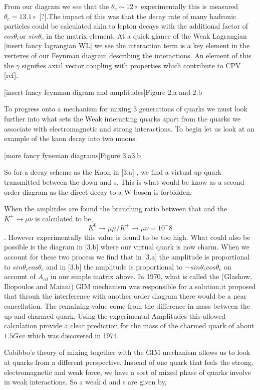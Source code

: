 From our diagram we see that the $\theta_c\sim 12\circ$ experimentally this is measured $\theta_c = 13.1\circ$ [?].The impact of this was that the decay rate of many hadronic particles could be calculated akin to lepton decays with the additional factor of $cos\theta_c$or $sin\theta_c$ in the matrix element. At a quick glance of the Weak Lagrangian [insert fancy lagrangian WL] we see the interaction term is a key element in the vertexes of our Feynman diagram describing the interactions. An element of this the $\gamma$ signifies axial vector coupling with properties which contribute to CPV [ref].

[insert fancy feynman digram and amplitudes]Figure {2.a} and {2.b}

To progress onto a mechanism for mixing 3 generations of quarks we must look further into what sets the Weak interacting quarks apart from the quarks we associate with electromagnetic and strong interactions. To begin let us look at an example of the kaon decay into two muons. 

[more fancy fyneman diagrams]Figure {3.a}{3.b}

So for a decay scheme as the Kaon in [3.a] , we find a virtual up quark transmitted between the down and s. This is what would be know as a second order diagram as the direct decay to a W boson is forbidden.

When the amplitdes are found the branching ratio between that and the $K^+\rightarrow\mu\nu$ is calculated to be,
 \[K^0\rightarrow\mu\mu/K^+\rightarrow\mu\nu=10^-8\]. 
However experimentally this value is found to be too high. What could also be possible is the diagram in [3.b] where our virtual quark is now charm. When we account for these two process we find that in [3.a] the amplitude is proportional to $sin\theta_c cos\theta_c$ and in [3.b] the amplitude is proportional to $-sin\theta_c cos\theta_c$ on account of $A_{cd}$ in our simple matrix above. 
In 1970, what is called the (Glashow, Iliopoulos and Maiani) GIM mechanism was responsible for a solution,it proposed that throuh the interference with another order diagram there would be a near cancellation. The remaining value come from the difference in mass between the up and charmed quark. Using the experimental Amplitudes this allowed calculation provide a clear prediction for the mass of the charmed quark of about $1.5Gev$ which was discovered in 1974.
 
Cabibbo’s theory of mixing together with the GIM mechanism allows us to look at quarks from a different perspective. Instead of one quark that feels the strong, electromagnetic and weak force, we have a sort of mixed phase of quarks involve in weak interactions. So a weak d and s are given by,


